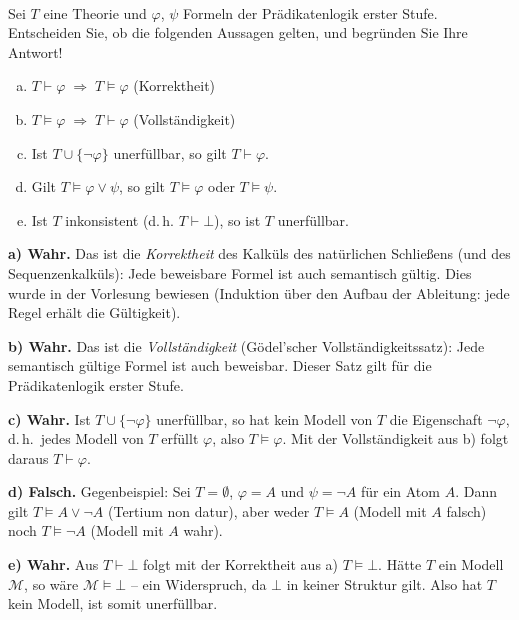 \\
Sei $T$ eine Theorie und $\varphi$, $\psi$ Formeln der Prädikatenlogik erster Stufe.
Entscheiden Sie, ob die folgenden Aussagen gelten, und begründen Sie Ihre Antwort!
\begin{enumerate}[a)]
  \item $T \vdash \varphi \;\Rightarrow\; T \models \varphi$ \quad (Korrektheit)
  \item $T \models \varphi \;\Rightarrow\; T \vdash \varphi$ \quad (Vollständigkeit)
  \item Ist $T \cup \{\neg\varphi\}$ unerfüllbar, so gilt $T \vdash \varphi$.
  \item Gilt $T \models \varphi \vee \psi$, so gilt $T \models \varphi$ oder $T \models \psi$.
  \item Ist $T$ inkonsistent (d.\,h. $T \vdash \bot$), so ist $T$ unerfüllbar.
\end{enumerate}

\begin{loesung}
\textbf{a) Wahr.} Das ist die \textit{Korrektheit} des Kalküls des natürlichen Schließens (und des Sequenzenkalküls): Jede beweisbare Formel ist auch semantisch gültig. Dies wurde in der Vorlesung bewiesen (Induktion über den Aufbau der Ableitung: jede Regel erhält die Gültigkeit).

\textbf{b) Wahr.} Das ist die \textit{Vollständigkeit} (Gödel'scher Vollständigkeitssatz): Jede semantisch gültige Formel ist auch beweisbar. Dieser Satz gilt für die Prädikatenlogik erster Stufe.

\textbf{c) Wahr.} Ist $T\cup\{\neg\varphi\}$ unerfüllbar, so hat kein Modell von $T$ die Eigenschaft $\neg\varphi$, d.\,h.\ jedes Modell von $T$ erfüllt $\varphi$, also $T\models\varphi$. Mit der Vollständigkeit aus b) folgt daraus $T\vdash\varphi$.

\textbf{d) Falsch.} Gegenbeispiel: Sei $T=\emptyset$, $\varphi = A$ und $\psi=\neg A$ für ein Atom $A$. Dann gilt $T\models A\vee\neg A$ (Tertium non datur), aber weder $T\models A$ (Modell mit $A$ falsch) noch $T\models\neg A$ (Modell mit $A$ wahr).

\textbf{e) Wahr.} Aus $T\vdash\bot$ folgt mit der Korrektheit aus a) $T\models\bot$. Hätte $T$ ein Modell $\mathcal{M}$, so wäre $\mathcal{M}\models\bot$ -- ein Widerspruch, da $\bot$ in keiner Struktur gilt. Also hat $T$ kein Modell, ist somit unerfüllbar.
\end{loesung}

